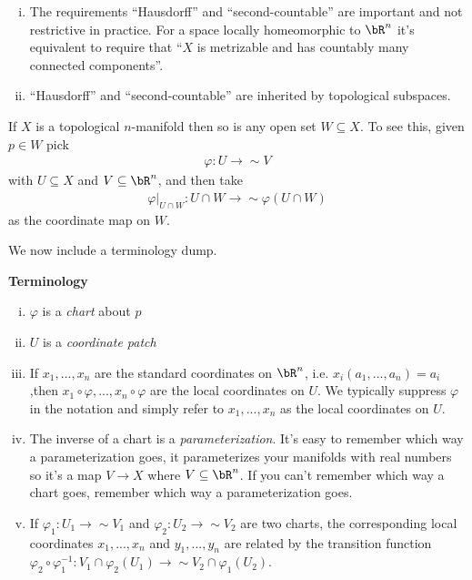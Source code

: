 \begin{rmk}\label{rmk:Hausdorff-second-countable-comment}
	$ $
	\begin{enumerate}[(i)]
		\item The requirements ``Hausdorff'' and ``second-countable'' are important and not restrictive in practice. For a space locally homeomorphic to $\bR^n$ it's equivalent to require that ``$X$ is metrizable and has countably many connected components''.
		\item ``Hausdorff'' and ``second-countable'' are inherited by topological subspaces.
	\end{enumerate}
\end{rmk}
\begin{example}\label{expl:subspace-is-sub-manifold}
	If $X$ is a topological $n$-manifold then so is any open set $W \subseteq X$. To see this, given $p \in W$ pick
	\begin{align*}
		\varphi:U\to{\sim}V
	\end{align*}
	with $U \subseteq X$ and $V \subseteq \bR^n$, and then take
	\begin{align*}
		\varphi|_{U\cap W}:U\cap W \to{\sim} \varphi(U\cap W)
	\end{align*}
	as the coordinate map on $W$.
\end{example}

\bigskip

We now include a terminology dump.

\bigskip

\noindent \textbf{Terminology}
\begin{enumerate}[(i)]
	\item $\varphi$ is a \emph{chart} about $p$
	\item $U$ is a \emph{coordinate patch}
	\item If $x_1,...,x_n$ are the standard coordinates on $\bR^n$, i.e. $x_i(a_1,...,a_n) = a_i$,then $x_1\circ \varphi,...,x_n\circ \varphi$ are the local coordinates on $U$. We typically suppress $\varphi$ in the notation and simply refer to $x_1,...,x_n$ as the local coordinates on $U$.
	\item The inverse of a chart is a \emph{parameterization}. It's easy to remember which way a parameterization goes, it parameterizes your manifolds with real numbers so it's a map $V \to X$ where $V \subseteq \bR^n$. If you can't remember which way a chart goes, remember which way a parameterization goes.
	\item If $\varphi_1:U_1\to{\sim}V_1$ and $\varphi_2:U_2\to{\sim}V_2$ are two charts, the corresponding local coordinates $x_1,...,x_n$ and $y_1,...,y_n$ are related by the transition function $\varphi_2\circ \varphi_1^{-1}:V_1\cap \varphi_2(U_1)\to{\sim}V_2\cap\varphi_1(U_2)$.
\end{enumerate}

